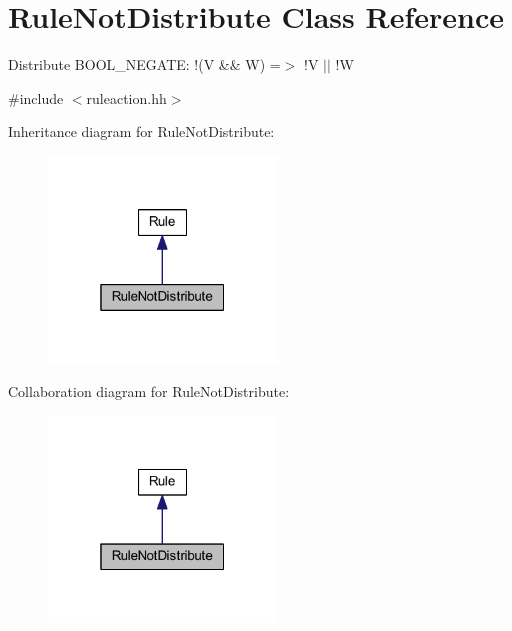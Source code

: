 \hypertarget{class_rule_not_distribute}{}\section{Rule\+Not\+Distribute Class Reference}
\label{class_rule_not_distribute}


Distribute B\+O\+O\+L\+\_\+\+N\+E\+G\+A\+TE\+: {\ttfamily !(V \&\& W) =$>$ !V $\vert$$\vert$ !W}  




{\ttfamily \#include $<$ruleaction.\+hh$>$}



Inheritance diagram for Rule\+Not\+Distribute\+:
\nopagebreak
\begin{figure}[H]
\begin{center}
\leavevmode
\includegraphics[width=172pt]{class_rule_not_distribute__inherit__graph}
\end{center}
\end{figure}


Collaboration diagram for Rule\+Not\+Distribute\+:
\nopagebreak
\begin{figure}[H]
\begin{center}
\leavevmode
\includegraphics[width=172pt]{class_rule_not_distribute__coll__graph}
\end{center}
\end{figure}
